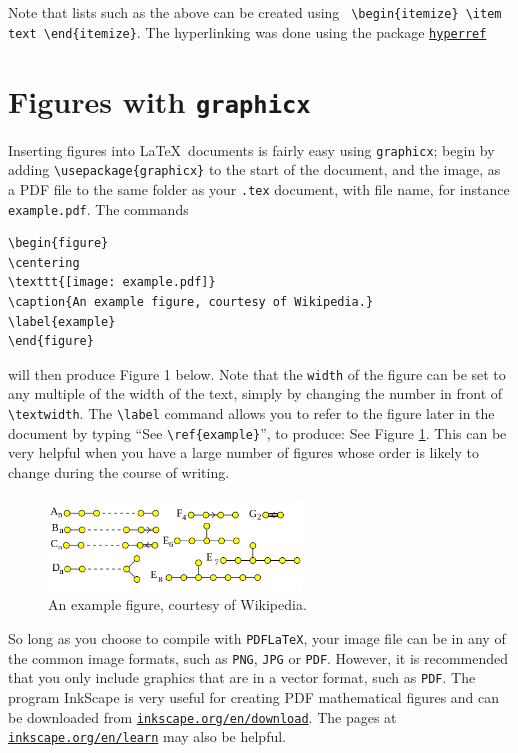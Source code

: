 \documentclass[11pt]{article}
\begin{document}
Note that lists such as the above can be created using \verb$ \begin{itemize} \item text \end{itemize}$. The hyperlinking was done using the package \href{https://en.wikibooks.org/wiki/LaTeX/Hyperlinks}{\texttt{hyperref}}

\section{Figures with \texttt{graphicx}}

Inserting figures into \LaTeX\ documents is fairly easy using \texttt{graphicx}; begin by adding \verb$\usepackage{graphicx}$ to the start of the document, and the image, as a PDF file to the same folder as your \verb$.tex$ document, with file name, for instance \verb$example.pdf$. The commands
\begin{verbatim}
\begin{figure}
\centering
\texttt{[image: example.pdf]}
\caption{An example figure, courtesy of Wikipedia.}
\label{example}
\end{figure}
\end{verbatim}
will then produce Figure 1 below. Note that the \verb$width$ of the figure can be set to any multiple of the width of the text, simply by changing the number in front of \verb$\textwidth$. The \verb$\label$ command allows you to refer to the figure later in the document by typing ``See \verb$\ref{example}$'', to produce: See Figure \ref{example}. This can be very helpful when you have a large number of figures whose order is likely to change during the course of writing.
\paragraph{}

\begin{figure}[h]
\centering
\includegraphics[width=0.6\textwidth]{example.png}
\caption{An example figure, courtesy of Wikipedia.}
\label{example}
\end{figure}

So long as you choose to compile with \texttt{PDFLaTeX}, your image file can be in any of the common image formats, such as \texttt{PNG}, \texttt{JPG} or \texttt{PDF}. However, it is recommended that you only include graphics that are in a vector format, such as \texttt{PDF}. The program InkScape is very useful for creating PDF mathematical figures and can be downloaded from \href{https://inkscape.org/en/download}{\texttt{inkscape.org/en/download}}. The pages at \href{https://inkscape.org/en/learn/}{\texttt{inkscape.org/en/learn}} may also be helpful.
\end{document}
